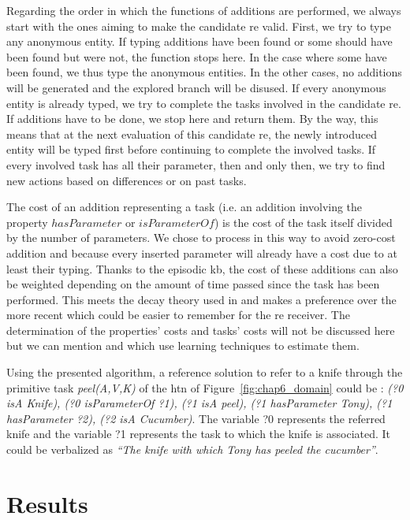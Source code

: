 Regarding the order in which the functions of additions are performed, we always start with the ones aiming to make the candidate \acrshort{re} valid. First, we try to type any anonymous entity. If typing additions have been found or some should have been found but were not, the function stops here. In the case where some have been found, we thus type the anonymous entities. In the other cases, no additions will be generated and the explored branch will be disused. If every anonymous entity is already typed, we try to complete the tasks involved in the candidate \acrshort{re}. If additions have to be done, we stop here and return them. By the way, this means that at the next evaluation of this candidate \acrshort{re}, the newly introduced entity will be typed first before continuing to complete the involved tasks. If every involved task has all their parameter, then and only then, we try to find new actions based on differences or on past tasks.

The cost of an addition representing a task (i.e. an addition involving the property $hasParameter$ or $isParameterOf$) is the cost of the task itself divided by the number of parameters. We chose to process in this way to avoid zero-cost addition and because every inserted parameter will already have a cost due to at least their typing. Thanks to the episodic \acrshort{kb}, the cost of these additions can also be weighted depending on the amount of time passed since the task has been performed. This meets the decay theory used in \cite{williams_2020_toward} and makes a preference over the more recent which could be easier to remember for the \acrshort{re} receiver. The determination of the properties' costs and tasks' costs will not be discussed here but we can mention \cite{belke_2002_tracking} and \cite{koolen_2012_learning} which use learning techniques to estimate them.

Using the presented algorithm, a reference solution to refer to a knife through the primitive task \textit{peel(A,V,K)} of the \acrshort{htn} of Figure~\ref{fig:chap6_domain} could be : \textit{(?0 isA Knife), (?0 isParameterOf ?1), (?1 isA peel), (?1 hasParameter Tony), (?1 hasParameter ?2), (?2 isA Cucumber)}. The variable ?0 represents the referred knife and the variable ?1 represents the task to which the knife is associated. It could be verbalized as \textit{``The knife with which Tony has peeled the cucumber''}.

\section{Results}

